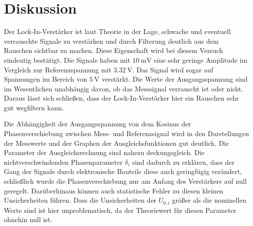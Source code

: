 \section{Diskussion}
\label{sec:Diskussion}
Der Lock-In-Verstärker ist laut Theorie in der Lage, schwache und eventuell
verrauschte Signale zu verstärken und durch Filterung deutlich aus dem Rauschen
sichtbar zu machen. Diese Eigenschaft wird bei diesem Versuch eindeutig bestätigt.
Die Signale haben mit $\SI{10}{\milli\volt}$ eine sehr geringe Amplitude im Vergleich
zur Referenzspannung mit $\SI{3,32}{\volt}$. Das Signal wird sogar auf Spannungen im Bereich
von $\SI{5}{\volt}$ verstärkt. Die Werte der Ausgangsspannung sind im Wesentlichen
unabhängig davon, ob das Messsignal verrauscht ist oder nicht. Daraus lässt sich
schließen, dass der Lock-In-Verstärker hier ein Rauschen sehr gut wegfiltern kann.

Die Abhängigkeit der Ausgangsspannung von dem Kosinus der Phasenverschiebung zwischen
Mess- und Referenzsignal wird in den Darstellungen der Messwerte und der Graphen
der Ausgleichsfunktionen gut deutlich. Die Parameter der Ausgleichsrechnung sind
nahezu deckungsgleich. Die nichtverschwindenden Phasenparameter $\delta_i$ sind
dadurch zu erklären, dass der Gang der Signale durch elektronische Bauteile diese
auch geringfügig verändert, schließlich wurde die Phasenverschiebung nur am
Anfang des Verstärkers auf null geregelt. Darüberhinaus können auch statistische
Fehler zu diesen kleinen Unsicherheiten führen.
Dass die Unsicherheiten der $U_{0,i}$ größer als die nominellen Werte sind ist hier unproblematisch,
da der Theoriewert für diesen Parameter ohnehin null ist.

